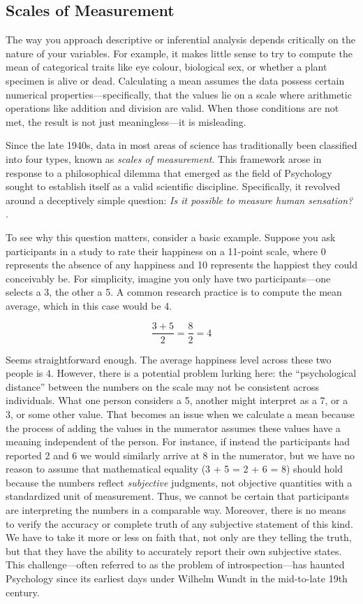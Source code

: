 \subsection{Scales of Measurement}

The way you approach descriptive or inferential analysis depends critically on the nature of your variables. For example, it makes little sense to try to compute the mean of categorical traits like eye colour, biological sex, or whether a plant specimen is alive or dead. Calculating a mean assumes the data possess certain numerical properties—specifically, that the values lie on a scale where arithmetic operations like addition and division are valid. When those conditions are not met, the result is not just meaningless—it is misleading.

Since the late 1940s, data in most areas of science has traditionally been classified into four types, known as \textit{scales of measurement}. This framework arose in response to a philosophical dilemma that emerged as the field of Psychology sought to establish itself as a valid scientific discipline. Specifically, it revolved around a deceptively simple question: \textit{Is it possible to measure human sensation?} \parencite[p. 677]{Stevens1946}.

To see why this question matters, consider a basic example. Suppose you ask participants in a study to rate their happiness on a 11-point scale, where 0 represents the absence of any happiness and 10 represents the happiest they could
conceivably be. For simplicity, imagine you only have two participants—one selects a 3, the other a 5. A common research practice is to compute the mean average, which in this case would be 4. 

\begin{equation}
\frac{3 + 5}{2} = \frac{8}{2} = 4
\end{equation}

Seems straightforward enough. The average happiness level across these two people is 4. However, there is a potential problem lurking here: the ``psychological distance'' between the numbers on the scale may not be consistent across individuals. What one person considers a 5, another might interpret as a 7, or a 3, or some other value. That becomes an issue when we calculate a mean because the process of adding the values in the numerator assumes these values have a meaning independent of the person. For instance, if instead the participants had reported 2 and 6 we would similarly arrive at 8 in the numerator, but we have no reason to assume that mathematical equality (3 + 5 = 2 + 6 = 8) should hold because the numbers reflect \textit{subjective} judgments, not objective quantities with a standardized unit of measurement. Thus, we cannot be certain that participants are interpreting the numbers in a comparable way. Moreover, there is no means to verify the accuracy or complete truth of any subjective statement of this kind. We have to take it more or less on faith that, not only are they telling the truth, but that they have the ability to accurately report their own subjective states. This challenge—often referred to as the problem of introspection—has haunted Psychology since its earliest days under Wilhelm Wundt in the mid-to-late 19th century. 

